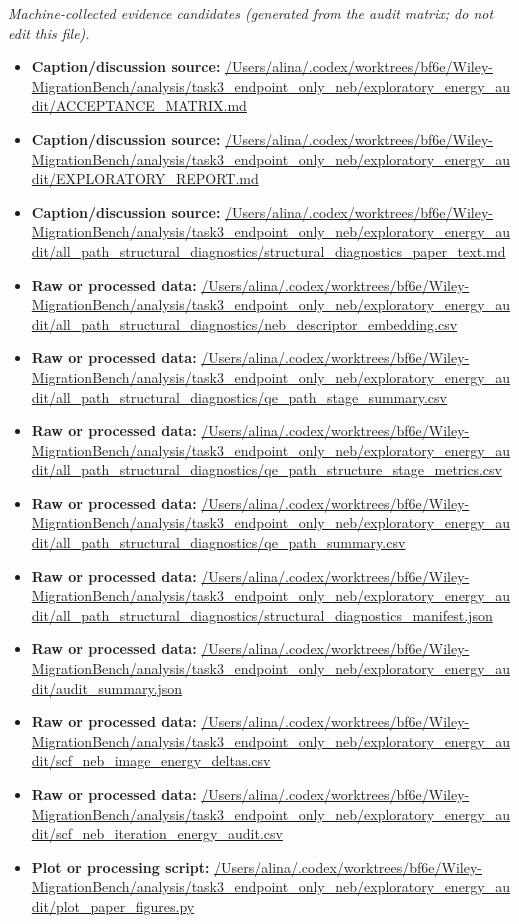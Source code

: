 \emph{Machine-collected evidence candidates (generated from the audit matrix; do not edit this file).}
\begin{itemize}[leftmargin=1.4em,noitemsep]
\item \textbf{Caption/discussion source:} \url{/Users/alina/.codex/worktrees/bf6e/Wiley-MigrationBench/analysis/task3_endpoint_only_neb/exploratory_energy_audit/ACCEPTANCE_MATRIX.md}
\item \textbf{Caption/discussion source:} \url{/Users/alina/.codex/worktrees/bf6e/Wiley-MigrationBench/analysis/task3_endpoint_only_neb/exploratory_energy_audit/EXPLORATORY_REPORT.md}
\item \textbf{Caption/discussion source:} \url{/Users/alina/.codex/worktrees/bf6e/Wiley-MigrationBench/analysis/task3_endpoint_only_neb/exploratory_energy_audit/all_path_structural_diagnostics/structural_diagnostics_paper_text.md}
\item \textbf{Raw or processed data:} \url{/Users/alina/.codex/worktrees/bf6e/Wiley-MigrationBench/analysis/task3_endpoint_only_neb/exploratory_energy_audit/all_path_structural_diagnostics/neb_descriptor_embedding.csv}
\item \textbf{Raw or processed data:} \url{/Users/alina/.codex/worktrees/bf6e/Wiley-MigrationBench/analysis/task3_endpoint_only_neb/exploratory_energy_audit/all_path_structural_diagnostics/qe_path_stage_summary.csv}
\item \textbf{Raw or processed data:} \url{/Users/alina/.codex/worktrees/bf6e/Wiley-MigrationBench/analysis/task3_endpoint_only_neb/exploratory_energy_audit/all_path_structural_diagnostics/qe_path_structure_stage_metrics.csv}
\item \textbf{Raw or processed data:} \url{/Users/alina/.codex/worktrees/bf6e/Wiley-MigrationBench/analysis/task3_endpoint_only_neb/exploratory_energy_audit/all_path_structural_diagnostics/qe_path_summary.csv}
\item \textbf{Raw or processed data:} \url{/Users/alina/.codex/worktrees/bf6e/Wiley-MigrationBench/analysis/task3_endpoint_only_neb/exploratory_energy_audit/all_path_structural_diagnostics/structural_diagnostics_manifest.json}
\item \textbf{Raw or processed data:} \url{/Users/alina/.codex/worktrees/bf6e/Wiley-MigrationBench/analysis/task3_endpoint_only_neb/exploratory_energy_audit/audit_summary.json}
\item \textbf{Raw or processed data:} \url{/Users/alina/.codex/worktrees/bf6e/Wiley-MigrationBench/analysis/task3_endpoint_only_neb/exploratory_energy_audit/scf_neb_image_energy_deltas.csv}
\item \textbf{Raw or processed data:} \url{/Users/alina/.codex/worktrees/bf6e/Wiley-MigrationBench/analysis/task3_endpoint_only_neb/exploratory_energy_audit/scf_neb_iteration_energy_audit.csv}
\item \textbf{Plot or processing script:} \url{/Users/alina/.codex/worktrees/bf6e/Wiley-MigrationBench/analysis/task3_endpoint_only_neb/exploratory_energy_audit/plot_paper_figures.py}
\end{itemize}
